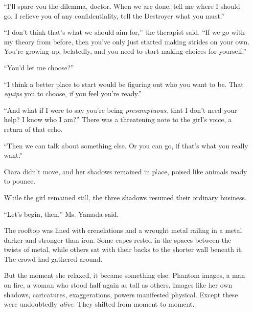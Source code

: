 ``I'll spare you the dilemma, doctor.  When we are done, tell me where I should go.  I relieve you of any confidentiality, tell the Destroyer what you must.''



``I don't think that's what we should aim for,'' the therapist said.  ``If we go with my theory from before, then you've only just started making strides on your own.  You're growing up, belatedly, and you need to start making choices for yourself.''



``You'd let me choose?''



``I think a better place to start would be figuring out who you want to be.  That \emph{equips} you to choose, if you feel you're ready.''



``And what if I were to say you're being \emph{presumptuous}, that I don't need your help?  I know who I am?''  There was a threatening note to the girl's voice, a return of that echo.



``Then we can talk about something else.  Or you can go, if that's what you really want.''



Ciara didn't move, and her shadows remained in place, poised like animals ready to pounce.



While the girl remained still, the three shadows resumed their ordinary business.



``Let's begin, then,'' Ms. Yamada said.



\sectionbreak



The rooftop was lined with crenelations and a wrought metal railing in a metal darker and stronger than iron.  Some capes rested in the spaces between the twists of metal, while others sat with their backs to the shorter wall beneath it.  The crowd had gathered around.



But the moment she relaxed, it became something else.  Phantom images, a man on fire, a woman who stood half again as tall as others.  Images like her own shadows, caricatures, exaggerations, powers manifested physical.  Except these were undoubtedly \emph{alive}.  They shifted from moment to moment.



